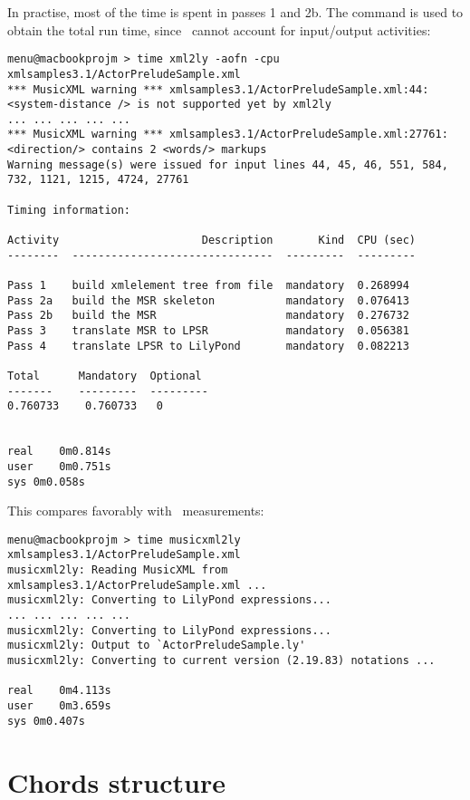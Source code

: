 In practise, most of the time is spent in passes 1 and 2b. The  command is used to obtain the total run time, since \xmlToLy\ cannot account for input/output activities:
\begin{lstlisting}[language=MusicXML]
menu@macbookprojm > time xml2ly -aofn -cpu xmlsamples3.1/ActorPreludeSample.xml
*** MusicXML warning *** xmlsamples3.1/ActorPreludeSample.xml:44: <system-distance /> is not supported yet by xml2ly
... ... ... ... ...
*** MusicXML warning *** xmlsamples3.1/ActorPreludeSample.xml:27761: <direction/> contains 2 <words/> markups
Warning message(s) were issued for input lines 44, 45, 46, 551, 584, 732, 1121, 1215, 4724, 27761

Timing information:

Activity                      Description       Kind  CPU (sec)
--------  -------------------------------  ---------  ---------

Pass 1    build xmlelement tree from file  mandatory  0.268994
Pass 2a   build the MSR skeleton           mandatory  0.076413
Pass 2b   build the MSR                    mandatory  0.276732
Pass 3    translate MSR to LPSR            mandatory  0.056381
Pass 4    translate LPSR to LilyPond       mandatory  0.082213

Total      Mandatory  Optional
-------    ---------  ---------
0.760733    0.760733   0


real	0m0.814s
user	0m0.751s
sys	0m0.058s
\end{lstlisting}

This compares favorably with \mxmlToLy\ measurements:
\begin{lstlisting}[language=MusicXML]
menu@macbookprojm > time musicxml2ly xmlsamples3.1/ActorPreludeSample.xml
musicxml2ly: Reading MusicXML from xmlsamples3.1/ActorPreludeSample.xml ...
musicxml2ly: Converting to LilyPond expressions...
... ... ... ... ...
musicxml2ly: Converting to LilyPond expressions...
musicxml2ly: Output to `ActorPreludeSample.ly'
musicxml2ly: Converting to current version (2.19.83) notations ...

real	0m4.113s
user	0m3.659s
sys	0m0.407s
\end{lstlisting}


\section{Chords structure}

